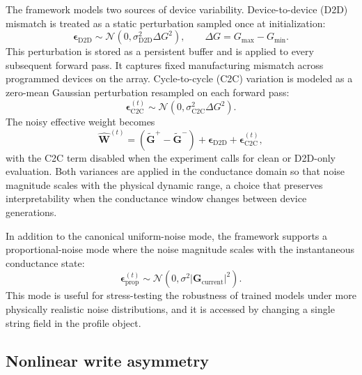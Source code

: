 The framework models two sources of device variability. Device-to-device (D2D) mismatch is treated as a static perturbation sampled once at initialization:
\begin{equation}
\boldsymbol{\epsilon}_{\text{D2D}} \sim \mathcal{N}\left(0, \sigma_{\text{D2D}}^{2} \Delta G^{2}\right), \qquad \Delta G = G_{\max} - G_{\min}.
\label{eq:d2d-model}
\end{equation}
This perturbation is stored as a persistent buffer and is applied to every subsequent forward pass. It captures fixed manufacturing mismatch across programmed devices on the array. Cycle-to-cycle (C2C) variation is modeled as a zero-mean Gaussian perturbation resampled on each forward pass:
\begin{equation}
\boldsymbol{\epsilon}_{\text{C2C}}^{(t)} \sim \mathcal{N}\left(0, \sigma_{\text{C2C}}^{2} \Delta G^{2}\right).
\label{eq:c2c-model}
\end{equation}
The noisy effective weight becomes
\begin{equation}
\widehat{\mathbf{W}}^{(t)} = \left(\widetilde{\mathbf{G}}^{+} - \widetilde{\mathbf{G}}^{-}\right) + \boldsymbol{\epsilon}_{\text{D2D}} + \boldsymbol{\epsilon}_{\text{C2C}}^{(t)},
\label{eq:noisy-weight}
\end{equation}
with the C2C term disabled when the experiment calls for clean or D2D-only evaluation. Both variances are applied in the conductance domain so that noise magnitude scales with the physical dynamic range, a choice that preserves interpretability when the conductance window changes between device generations.

In addition to the canonical uniform-noise mode, the framework supports a proportional-noise mode where the noise magnitude scales with the instantaneous conductance state:
\begin{equation}
\boldsymbol{\epsilon}^{(t)}_{\text{prop}} \sim \mathcal{N}\left(0, \sigma^2 \lvert \mathbf{G}_{\text{current}} \rvert^2\right).
\label{eq:proportional-noise}
\end{equation}
This mode is useful for stress-testing the robustness of trained models under more physically realistic noise distributions, and it is accessed by changing a single string field in the profile object.

\subsection{Nonlinear write asymmetry}
\label{subsec:nl-interface}

